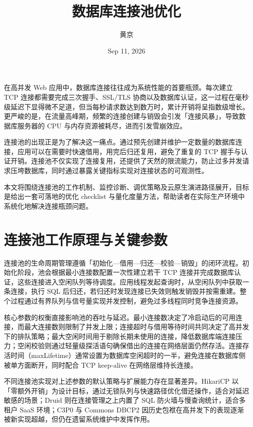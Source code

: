\title{数据库连接池优化}
\author{黄京}
\date{Sep 11, 2026}
\maketitle
在高并发 Web 应用中，数据库连接往往成为系统性能的首要瓶颈。每次建立 TCP 连接都需要完成三次握手、SSL/TLS 协商以及数据库认证，这一过程在毫秒级延迟下显得微不足道，但当每秒请求数达到数万时，累计开销将呈指数级增长。更严峻的是，在流量高峰期，频繁的连接创建与销毁会引发「连接风暴」，导致数据库服务器的 CPU 与内存资源被耗尽，进而引发雪崩效应。\par
连接池的出现正是为了解决这一痛点。通过预先创建并维护一定数量的数据库连接，应用可以在需要时快速借用，用完后归还复用，避免了重复的 TCP 握手与认证开销。连接池不仅实现了连接复用，还提供了天然的限流能力，防止过多并发请求压垮数据库，同时通过暴露关键指标实现对连接状态的可观测性。\par
本文将围绕连接池的工作机制、监控诊断、调优策略及云原生演进路径展开，目标是给出一套可落地的优化 checklist 与量化度量方法，帮助读者在实际生产环境中系统化地解决连接瓶颈问题。\par
\chapter{连接池工作原理与关键参数}
连接池的生命周期管理遵循「初始化—借用—归还—校验—销毁」的闭环流程。初始化阶段，池会根据最小连接数配置一次性建立若干 TCP 连接并完成数据库认证，这些连接进入空闲队列等待调度。应用线程发起查询时，从空闲队列中获取一条连接，执行 SQL 后归还，若归还时发现连接已失效则触发销毁并按需重建。整个过程通过有界队列与信号量实现并发控制，避免过多线程同时竞争连接资源。\par
核心参数的权衡直接影响池的吞吐与延迟。最小连接数决定了冷启动后的可用连接，而最大连接数则限制了并发上限；连接超时与借用等待时间共同决定了高并发下的排队策略；最大空闲时间用于剔除长期未使用的连接，降低数据库端连接压力；空闲校验则通过轻量级探活语句确保借出的连接在网络层面仍然存活。连接存活时间（maxLifetime）通常设置为数据库空闲超时的一半，避免连接在数据库侧被单方面断开，同时配合 TCP keep-alive 在网络层维持长连接。\par
不同连接池实现对上述参数的默认策略与扩展能力存在显著差异。HikariCP 以「零额外开销」为设计目标，通过无锁队列与快速路径优化借还操作，适合对延迟敏感的场景；Druid 则在连接管理之上内置了 SQL 防火墙与慢查询统计，适合多租户 SaaS 环境；C3P0 与 Commons DBCP2 因历史包袱在高并发下的表现逐渐被新实现超越，但仍在遗留系统维护中发挥作用。\par
